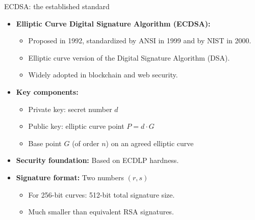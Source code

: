 \ifdefined\PRESENTATION\else\PassOptionsToClass{handout}{beamer}\fi\documentclass[aspectratio=169, lualatex]{beamer}
\begin{document}
\begin{frame}{ECDSA: the established standard}
	\begin{itemize}
		\item \textbf{Elliptic Curve Digital Signature Algorithm (ECDSA):}
		      \begin{itemize}
			      \item Proposed in 1992, standardized by ANSI in 1999 and by NIST in 2000.
			      \item Elliptic curve version of the Digital Signature Algorithm (DSA).
			      \item Widely adopted in blockchain and web security.
		      \end{itemize}
		\item \textbf{Key components:}
		      \begin{itemize}
			      \item Private key: secret number $d$
			      \item Public key: elliptic curve point $P = d \cdot G$
			      \item Base point $G$ (of order $n$) on an agreed elliptic curve
		      \end{itemize}
		\item \textbf{Security foundation:} Based on ECDLP hardness.
		\item \textbf{Signature format:} Two numbers $(r, s)$
		      \begin{itemize}
			      \item For 256-bit curves: 512-bit total signature size.
			      \item Much smaller than equivalent RSA signatures.
		      \end{itemize}
	\end{itemize}
\end{frame}
\end{document}
